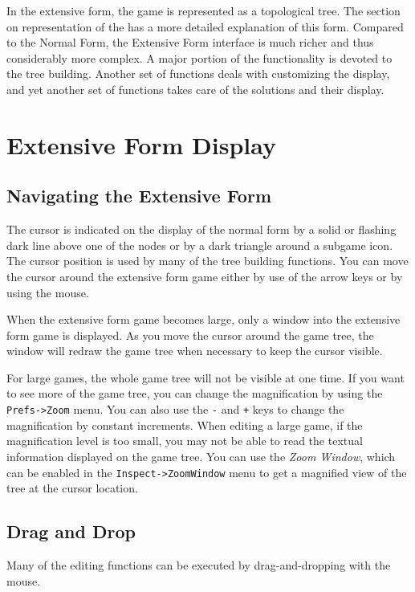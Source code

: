 \documentclass[12pt]{report}
\begin{document}
In the extensive form, the game is represented as a topological tree.  The 
section on representation of the  
has a more detailed explanation of this form.
Compared to the Normal Form, the Extensive Form interface is much richer
and thus considerably more complex.  A major portion of the functionality
is devoted to the tree building.  Another set of functions deals with
customizing the display, and yet another set of functions takes care of
the solutions and their display.  

\section{Extensive Form Display}

\subsection{Navigating the Extensive Form}
The cursor is indicated on the display of the normal form by a 
solid or flashing dark line above 
one of the nodes or by a dark triangle around a subgame icon. 
The cursor position is used by many of the tree building functions.  
You can move the cursor around the extensive form game 
either by use of the arrow keys or by using the mouse.  

When the extensive form 
game becomes large, only a window into the extensive form game is displayed.  
As you move the cursor around the game tree, the window will redraw 
the game tree when necessary to keep the cursor visible. 

For large games, the whole game tree will not be visible at one time.  If you 
want to see more of the game tree, you can change the magnification by 
using the {\tt Prefs->Zoom} menu.  You can also use the \verb+-+ and 
\verb&+& keys to change the magnification by constant increments. When 
editing a large game, if the magnification level is too small, you may 
not be able to read the textual information displayed on the game tree.  You 
can use the {\em Zoom Window}, which can be enabled in the 
{\tt Inspect->ZoomWindow} menu to get a magnified view of the tree 
at the cursor location.  

\subsection{Drag and Drop}\label{DragAndDrop}
Many of the editing functions can be executed by drag-and-dropping
with the mouse.  
\end{document}
